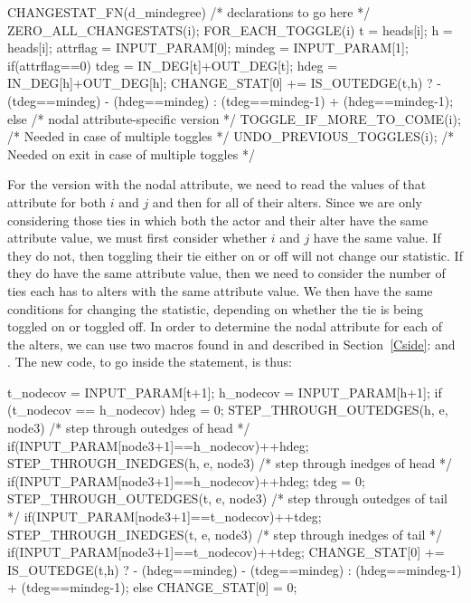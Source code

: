 \documentclass[nojss]{jss}
\begin{document}
\begin{CodeChunk}
\begin{CodeInput}
CHANGESTAT_FN(d_mindegree) {
  /* declarations to go here */
  ZERO_ALL_CHANGESTATS(i);
  FOR_EACH_TOGGLE(i) {
    t = heads[i]; h = heads[i];
    attrflag = INPUT_PARAM[0];
    mindeg = INPUT_PARAM[1];
    if(attrflag==0){
      tdeg = IN_DEG[t]+OUT_DEG[t];
      hdeg = IN_DEG[h]+OUT_DEG[h];
      CHANGE_STAT[0] += IS_OUTEDGE(t,h) ?
        - (tdeg==mindeg) - (hdeg==mindeg) :
        (tdeg==mindeg-1) + (hdeg==mindeg-1);
    }else{
      /* nodal attribute-specific version */
    }
    TOGGLE_IF_MORE_TO_COME(i); /* Needed in case of multiple toggles */
  }
  UNDO_PREVIOUS_TOGGLES(i); /* Needed on exit in case of multiple toggles */
}
\end{CodeInput}
\end{CodeChunk}

For the version with the nodal attribute, we need to read the values of that attribute for both $i$ and $j$ and then for all of their alters.  Since we are only considering those ties in which both the actor and their alter have the same attribute value, we must first consider whether $i$ and $j$ have the same value.  If they do not, then toggling their tie either on or off will not change our statistic. If they do have the same attribute value, then we need to consider the number of ties each has to alters with the same attribute value. We then have the same conditions for changing the statistic, depending on whether the tie is being toggled on or toggled off. In order to determine the nodal attribute for each of the alters, we can use two macros found in  and described in Section~\ref{Cside}:  and . The new code, to go inside the  statement, is thus:
\begin{CodeChunk}
\begin{CodeInput}
      t_nodecov = INPUT_PARAM[t+1];
      h_nodecov = INPUT_PARAM[h+1];
      if (t_nodecov == h_nodecov) {
        hdeg = 0;
        STEP_THROUGH_OUTEDGES(h, e, node3) { /* step through outedges of head */
          if(INPUT_PARAM[node3+1]==h_nodecov){++hdeg;}
        }
        STEP_THROUGH_INEDGES(h, e, node3) { /* step through inedges of head */
          if(INPUT_PARAM[node3+1]==h_nodecov){++hdeg;}
        }
        tdeg = 0;
        STEP_THROUGH_OUTEDGES(t, e, node3) { /* step through outedges of tail */
          if(INPUT_PARAM[node3+1]==t_nodecov){++tdeg;}
        }
        STEP_THROUGH_INEDGES(t, e, node3) { /* step through inedges of tail */
          if(INPUT_PARAM[node3+1]==t_nodecov){++tdeg;}
        }
        CHANGE_STAT[0] += IS_OUTEDGE(t,h) ?
          - (hdeg==mindeg) - (tdeg==mindeg) :
          (hdeg==mindeg-1) + (tdeg==mindeg-1);
      }else{
        CHANGE_STAT[0] = 0;
      }

\end{CodeInput}
\end{CodeChunk}
\end{document}

